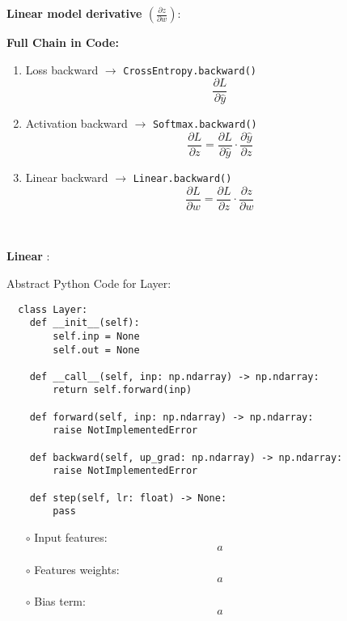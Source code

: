 \documentclass{article}
\newenvironment{cheatformula}[1][כותרת]{
    \begin{minipage}{\linewidth}
    \textbf{#1}:
}{
    \end{minipage}\\[0ex]
}
\begin{document}
\begin{multicols*}{2}
\begin{cheatformula}[Linear model derivative $\left(\frac{\partial z}{\partial w}\right)$]
  
  \noindent\textbf{Full Chain in Code:}
  \begin{enumerate}
      \item Loss backward $\rightarrow$ \texttt{CrossEntropy.backward()}
      \[
      \frac{\partial L}{\partial \hat{y}}
      \]
      \item Activation backward $\rightarrow$ \texttt{Softmax.backward()}
      \[
      \frac{\partial L}{\partial z} = \frac{\partial L}{\partial \hat{y}} \cdot \frac{\partial \hat{y}}{\partial z}
      \]
      \item Linear backward $\rightarrow$ \texttt{Linear.backward()}
      \[
      \frac{\partial L}{\partial w} = \frac{\partial L}{\partial z} \cdot \frac{\partial z}{\partial w}
      \]
  \end{enumerate}

  \end{cheatformula}
    
  
  
  


\begin{cheatformula}[Linear ]
Abstract Python Code for Layer:
\begin{lstlisting}
  class Layer:
    def __init__(self):
        self.inp = None
        self.out = None

    def __call__(self, inp: np.ndarray) -> np.ndarray:
        return self.forward(inp)

    def forward(self, inp: np.ndarray) -> np.ndarray:
        raise NotImplementedError

    def backward(self, up_grad: np.ndarray) -> np.ndarray:
        raise NotImplementedError

    def step(self, lr: float) -> None:
        pass
\end{lstlisting}

\begin{itemize}
  \item[$\circ$] Input features:
  \begin{equation}
a  
  \end{equation}

  \item[$\circ$] Features weights:
  \begin{equation}
  a
  \end{equation}

  \item[$\circ$] Bias term:
  \begin{equation}
  a
  \end{equation}


\end{itemize}
\end{cheatformula}
\end{multicols*}
\end{document}
